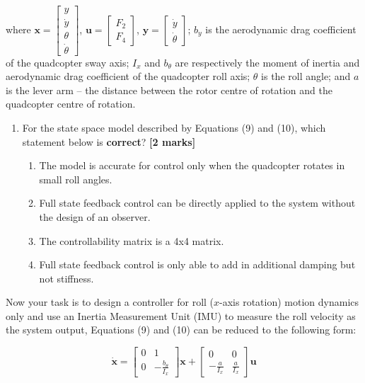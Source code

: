 \documentclass{article}
\begin{document}
where $\mathbf{x} = \begin{bmatrix} y \\ \dot{y} \\ \theta \\ \dot{\theta} \end{bmatrix}$, $\mathbf{u} = \begin{bmatrix} F_2 \\ F_4 \end{bmatrix}$, $\mathbf{y} = \begin{bmatrix} \dot{y} \\ \dot{\theta} \end{bmatrix}$; $b_y$ is the aerodynamic drag coefficient of the quadcopter sway axis; $I_x$ and $b_\theta$ are respectively the moment of inertia and aerodynamic drag coefficient of the quadcopter roll axis; $\theta$ is the roll angle; and $a$ is the lever arm -- the distance between the rotor centre of rotation and the quadcopter centre of rotation.

\begin{enumerate}[resume]
    \item For the state space model described by Equations (9) and (10), which statement below is \textbf{correct}? \hfill \textbf{[2 marks]}
    \begin{enumerate}[label=\alph*.]
        \item The model is accurate for control only when the quadcopter rotates in small roll angles.
        \item Full state feedback control can be directly applied to the system without the design of an observer.
        \item The controllability matrix is a 4x4 matrix.
        \item Full state feedback control is only able to add in additional damping but not stiffness.
    \end{enumerate}
\end{enumerate}

Now your task is to design a controller for roll ($x$-axis rotation) motion dynamics only and use an Inertia Measurement Unit (IMU) to measure the roll velocity as the system output, Equations (9) and (10) can be reduced to the following form:

\begin{equation}
\dot{\mathbf{x}} = \begin{bmatrix} 0 & 1 \\ 0 & -\frac{b_\theta}{I_x} \end{bmatrix} \mathbf{x} + \begin{bmatrix} 0 & 0 \\ -\frac{a}{I_x} & \frac{a}{I_x} \end{bmatrix} \mathbf{u}
\end{equation}
\end{document}
